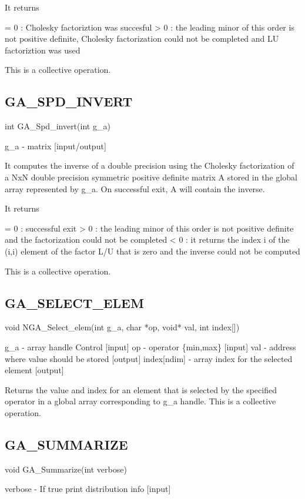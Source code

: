 It returns

= 0 : Cholesky factoriztion was succesful > 0 : the leading minor
of this order is not positive definite, Cholesky factorization could
not be completed and LU factoriztion was used

This is a collective operation. 


\subsection*{GA\_SPD\_INVERT}

int GA\_Spd\_invert(int g\_a)

g\_a - matrix {[}input/output{]}

It computes the inverse of a double precision using the Cholesky factorization
of a NxN double precision symmetric positive definite matrix A stored
in the global array represented by g\_a. On successful exit, A will
contain the inverse.

It returns

= 0 : successful exit > 0 : the leading minor of this order is not
positive definite and the factorization could not be completed < 0
: it returns the index i of the (i,i) element of the factor L/U that
is zero and the inverse could not be computed

This is a collective operation. 


\subsection*{GA\_SELECT\_ELEM}

void NGA\_Select\_elem(int g\_a, char {*}op, void{*} val, int index{[}{]})

g\_a - array handle Control {[}input{]} op - operator \{\textquotedbl{}min\textquotedbl{},\textquotedbl{}max\textquotedbl{}\}
{[}input{]} val - address where value should be stored {[}output{]}
index{[}ndim{]} - array index for the selected element {[}output{]}

Returns the value and index for an element that is selected by the
specified operator in a global array corresponding to g\_a handle.
This is a collective operation. 


\subsection*{GA\_SUMMARIZE}

void GA\_Summarize(int verbose)

verbose - If true print distribution info {[}input{]}

